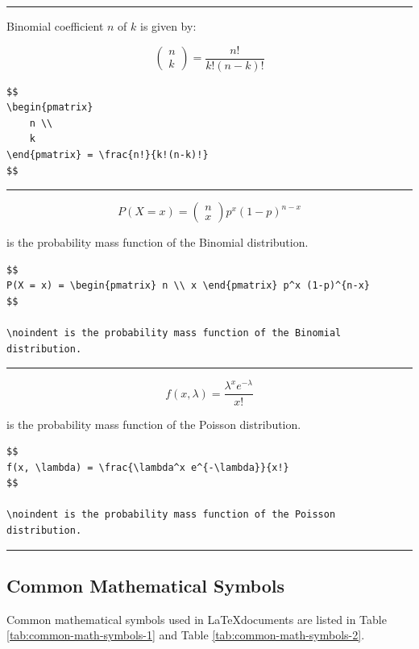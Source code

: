 \documentclass[12pt]{article}
\begin{document}
\hrule 

Binomial coefficient $n$ of $k$ is given by:

$$
\begin{pmatrix} n \\ k \end{pmatrix} = \frac{n!}{k!(n-k)!}
$$

\begin{verbatim}
$$
\begin{pmatrix} 
    n \\
    k 
\end{pmatrix} = \frac{n!}{k!(n-k)!}
$$
\end{verbatim}

\hrule

$$
P(X = x) = \begin{pmatrix} n \\ x \end{pmatrix} p^x (1-p)^{n-x}
$$

\noindent is the probability mass function of the Binomial distribution.

\begin{verbatim}
$$
P(X = x) = \begin{pmatrix} n \\ x \end{pmatrix} p^x (1-p)^{n-x}
$$

\noindent is the probability mass function of the Binomial distribution.
\end{verbatim}

\hrule

$$
f(x, \lambda) = \frac{\lambda^x e^{-\lambda}}{x!}
$$

\noindent is the probability mass function of the Poisson distribution.

\begin{verbatim}
$$
f(x, \lambda) = \frac{\lambda^x e^{-\lambda}}{x!}
$$

\noindent is the probability mass function of the Poisson distribution.
\end{verbatim}

\hrule


\subsection{Common Mathematical Symbols}
Common mathematical symbols used in \LaTeX documents are listed in Table \ref{tab:common-math-symbols-1} 
and Table \ref{tab:common-math-symbols-2}.
\end{document}
